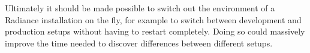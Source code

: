 \documentclass{sig-alternate}
\begin{document}
Ultimately it should be made possible to switch out the environment of a Radiance installation on the fly, for example to switch between development and production setups without having to restart completely. Doing so could massively improve the time needed to discover differences between different setups.


\end{document}
